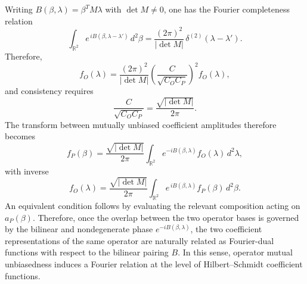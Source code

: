 \documentclass[aps,pra,onecolumn,nofootinbib,superscriptaddress,showpacs]{revtex4}
\begin{document}
%
Writing $B(\beta,\lambda)=\beta^{T}M\lambda$ with
$\det M\neq 0$, one has the Fourier completeness relation
\begin{equation}
\int_{\mathbb R^2}
e^{\,iB(\beta,\lambda-\lambda')}
\, d^2\beta
=
\frac{(2\pi)^2}{|\det M|}
\,\delta^{(2)}(\lambda-\lambda').
\end{equation}
Therefore,
\begin{equation}
f_O(\lambda)
=
\frac{(2\pi)^2}{|\det M|}
\left(
\frac{C}{\sqrt{C_O C_P}}
\right)^2
f_O(\lambda),
\end{equation}
and consistency requires
\begin{equation}
\frac{C}{\sqrt{C_O C_P}}
=
\frac{\sqrt{|\det M|}}{2\pi}.
\label{eq:normalisation_condition}
\end{equation}
%
The transform between mutually unbiased coefficient amplitudes therefore becomes
\begin{equation}
f_P(\beta)
=
\frac{\sqrt{|\det M|}}{2\pi}
\int_{\mathbb R^2}
e^{-iB(\beta,\lambda)}
f_O(\lambda)\, d^2\lambda,
\label{fP}
\end{equation}
with inverse
\begin{equation}
f_O(\lambda)
=
\frac{\sqrt{|\det M|}}{2\pi}
\int_{\mathbb R^2}
e^{\,iB(\beta,\lambda)}
f_P(\beta)\, d^2\beta.
\end{equation}
An equivalent condition follows by evaluating
the relevant composition acting on \(a_P(\beta)\).
Therefore, once the overlap between the two operator bases is governed by
the bilinear and nondegenerate phase \(e^{-iB(\beta,\lambda)}\), the two coefficient
representations of the same operator are naturally related as Fourier-dual
functions with respect to the bilinear pairing \(B\). In this sense, operator mutual unbiasedness induces a Fourier relation at the level of Hilbert--Schmidt coefficient functions.
\end{document}
